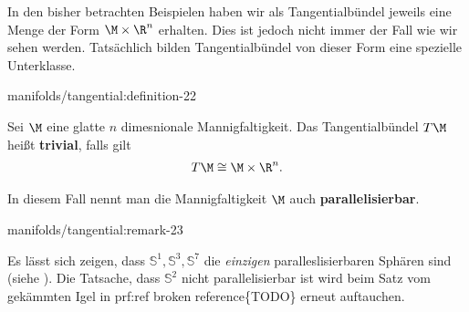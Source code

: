 \documentclass[letterpaper,10pt,german]{jupyterBook}
\begin{document}
\par
In den bisher betrachten Beispielen haben wir als Tangentialbündel jeweils eine Menge der Form \(\M\times \R^n\) erhalten.
Dies ist jedoch nicht immer der Fall wie wir sehen werden.
Tatsächlich bilden Tangentialbündel von dieser Form eine spezielle Unterklasse.
\begin{definition}{}{manifolds/tangential:definition-22}



\par
Sei \(\M\) eine glatte \(n\) dimesnionale Mannigfaltigkeit.
Das Tangentialbündel \(T\M\) heißt \textbf{trivial}, falls gilt
\begin{align*}
T\M\cong \M\times\R^n.
\end{align*}
\par
In diesem Fall nennt man die Mannigfaltigkeit \(\M\) auch \textbf{parallelisierbar}.
\end{definition}
\begin{remark}{}{manifolds/tangential:remark-23}



\par
Es lässt sich zeigen, dass \(\mathbb{S}^1, \mathbb{S}^3,\mathbb{S}^7\) die \emph{einzigen} paralleslisierbaren Sphären sind (siehe \cite{Lee03}).
Die Tatsache, dass \(\mathbb{S}^2\) nicht parallelisierbar ist wird beim Satz vom gekämmten Igel in {prf:ref broken reference}\{TODO\} erneut auftauchen.
\end{remark}
\end{document}
